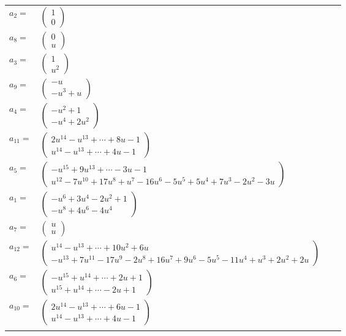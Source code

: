 \documentclass[1p]{elsarticle_modified}
\theoremstyle{definition}
\begin{document}
\begin{tabular}{m{7pt} m{180pt} m{7pt} m{180pt} }
\flushright $a_{2}=$&$\begin{pmatrix}1\\0\end{pmatrix}$ \\
\flushright $a_{8}=$&$\begin{pmatrix}0\\u\end{pmatrix}$ \\
\flushright $a_{3}=$&$\begin{pmatrix}1\\u^2\end{pmatrix}$ \\
\flushright $a_{9}=$&$\begin{pmatrix}- u\\- u^3+u\end{pmatrix}$ \\
\flushright $a_{4}=$&$\begin{pmatrix}- u^2+1\\- u^4+2 u^2\end{pmatrix}$ \\
\flushright $a_{11}=$&$\begin{pmatrix}2 u^{14}- u^{13}+\cdots+8 u-1\\u^{14}- u^{13}+\cdots+4 u-1\end{pmatrix}$ \\
\flushright $a_{5}=$&$\begin{pmatrix}- u^{15}+9 u^{13}+\cdots-3 u-1\\u^{12}-7 u^{10}+17 u^8+u^7-16 u^6-5 u^5+5 u^4+7 u^3-2 u^2-3 u\end{pmatrix}$ \\
\flushright $a_{1}=$&$\begin{pmatrix}- u^6+3 u^4-2 u^2+1\\- u^8+4 u^6-4 u^4\end{pmatrix}$ \\
\flushright $a_{7}=$&$\begin{pmatrix}u\\u\end{pmatrix}$ \\
\flushright $a_{12}=$&$\begin{pmatrix}u^{14}- u^{13}+\cdots+10 u^2+6 u\\- u^{13}+7 u^{11}-17 u^9-2 u^8+16 u^7+9 u^6-5 u^5-11 u^4+u^3+2 u^2+2 u\end{pmatrix}$ \\
\flushright $a_{6}=$&$\begin{pmatrix}- u^{15}+u^{14}+\cdots+2 u+1\\u^{15}+u^{14}+\cdots-2 u+1\end{pmatrix}$ \\
\flushright $a_{10}=$&$\begin{pmatrix}2 u^{14}- u^{13}+\cdots+6 u-1\\u^{14}- u^{13}+\cdots+4 u-1\end{pmatrix}$\\&\end{tabular}
\end{document}
